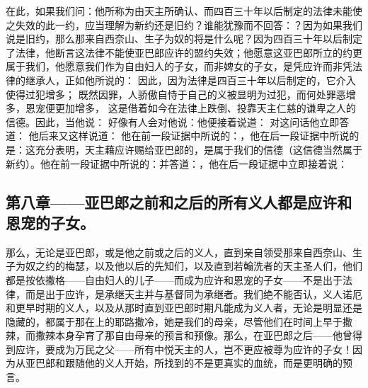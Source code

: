 在此，如果我们问：他所称为由天主所确认、而四百三十年以后制定的法律未能使之失效的此一约，应当理解为新约还是旧约？谁能犹豫而不回答：？因为如果我们说是旧约，那么那来自西奈山、生子为奴的将是什么呢？因为四百三十年以后制定了法律，他断言这法律不能使亚巴郎应许的盟约失效；他愿意这亚巴郎所立的约更属于我们，他愿意我们作为自由妇人的子女，而非婢女的子女，是凭应许而非凭法律的继承人，正如他所说的： 因此，因为法律是四百三十年以后制定的，它介入使得过犯增多； 既然因罪，人骄傲自恃于自己的义被显明为过犯，而何处罪恶增多，恩宠便更加增多， 这是借着如今在法律上跌倒、投靠天主仁慈的谦卑之人的信德。因此，当他说： 好像有人会对他说：他便接着说道： 对这问话他立即答道： 他后来又这样说道： 他在前一段证据中所说的：，他在后一段证据中所说的是：这充分表明，天主藉应许赐给亚巴郎的，是属于我们的信德（这信德当然属于新约）。他在前一段证据中所说的：并答道：，他在后一段证据中立即接着说：\par


\subsection{第八章——亚巴郎之前和之后的所有义人都是应许和恩宠的子女。}

那么，无论是亚巴郎，或是他之前或之后的义人，直到亲自领受那来自西奈山、生子为奴之约的梅瑟，以及他以后的先知们，以及直到若翰洗者的天主圣人们，他们都是按依撒格——自由妇人的儿子——而成为应许和恩宠的子女——不是出于法律，而是出于应许，是承继天主并与基督同为承继者。我们绝不能否认，义人诺厄和更早时期的义人，以及从那时直到亚巴郎时期凡能成为义人者，无论是明显还是隐藏的，都属于那在上的耶路撒冷，她是我们的母亲，尽管他们在时间上早于撒辣，而撒辣本身孕育了那自由母亲的预言和预像。那么，在亚巴郎之后——他曾得到应许，要成为万民之父——所有中悦天主的人，岂不更应被尊为应许的子女！因为从亚巴郎和跟随他的义人开始，所找到的不是更真实的血统，而是更明确的预言。\par

